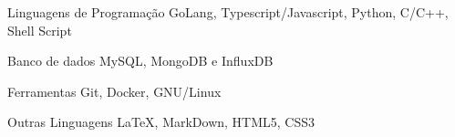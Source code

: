 
\begin{cvskills}
  \cvskill
  {Linguagens de Programação}
  {GoLang, Typescript/Javascript, Python, C/C++, Shell Script}

  \cvskill
  {Banco de dados}
  {MySQL, MongoDB e InfluxDB}

  \cvskill
  {Ferramentas}
  {Git, Docker, GNU/Linux}


  \cvskill
  {Outras Linguagens}
  {LaTeX, MarkDown, HTML5, CSS3}
\end{cvskills}
